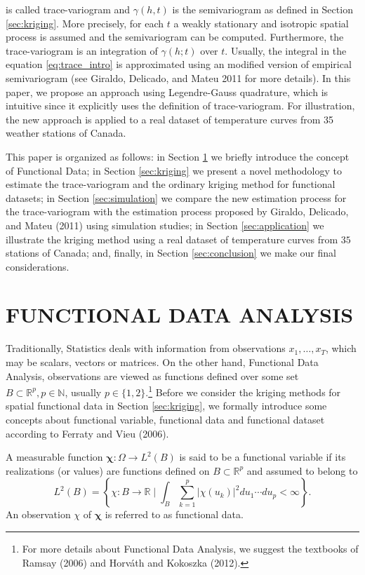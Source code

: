 \documentclass[12pt,]{article}
\theoremstyle{definition}
\theoremstyle{definition}
\theoremstyle{definition}
\theoremstyle{remark}
\let\BeginKnitrBlock\begin \let\EndKnitrBlock\end
\begin{document}
is called trace-variogram and \(\gamma(h, t)\) is the semivariogram as defined in Section \ref{sec:kriging}.
More precisely, for each \(t\) a weakly stationary and isotropic spatial process is assumed and the semivariogram can be computed. Furthermore, the trace-variogram is an
integration of \(\gamma(h;t)\) over \(t\). Usually, the integral in the equation \ref{eq:trace_intro} is approximated using an modified version of empirical semivariogram (see Giraldo, Delicado, and Mateu 2011 for more details).
In this paper, we propose an approach using Legendre-Gauss quadrature, which is intuitive since it explicitly uses the definition of trace-variogram.
For illustration, the new approach is applied to a real dataset of temperature curves from 35 weather stations of Canada.

This paper is organized as follows: in Section \ref{sec:functionalDataAnalysis} we briefly introduce the concept of Functional Data; in Section \ref{sec:kriging} we present a novel methodology to estimate the trace-variogram and the ordinary kriging method for functional datasets; in Section \ref{sec:simulation} we compare the new estimation process for the trace-variogram with the estimation process proposed by Giraldo, Delicado, and Mateu (2011) using simulation studies;
in Section \ref{sec:application} we illustrate the kriging method using a real dataset of temperature curves from \(35\) stations of Canada; and, finally, in Section \ref{sec:conclusion} we make our final considerations.

\hypertarget{sec:functionalDataAnalysis}{%
\section{FUNCTIONAL DATA ANALYSIS}\label{sec:functionalDataAnalysis}}

Traditionally, Statistics deals with information from observations \(x_1, \dots, x_T\), which may be scalars, vectors or matrices. On the other hand, Functional Data Analysis,
observations are viewed as functions defined over some set \(B \subset \mathbb{R}^p, p \in \mathbb{N}\), usually \(p \in \{1,2\}\).\footnote{For more details about Functional Data Analysis, we suggest the textbooks of Ramsay (2006) and Horváth and Kokoszka (2012).} Before we consider the kriging methods for spatial functional data in Section \ref{sec:kriging}, we formally introduce some concepts about functional variable, functional data and functional dataset
according to Ferraty and Vieu (2006).

\BeginKnitrBlock{definition}
\protect\hypertarget{def:unnamed-chunk-1}{}{\label{def:unnamed-chunk-1} }A measurable function \(\bm{\chi}: \Omega \rightarrow L^2(B)\) is said to be a functional variable if its realizations (or values) are functions defined on \(B \subset \mathbb{R}^ p\) and assumed to belong to
\[
    L^2(B) = \left\{\chi:B \longrightarrow \mathbb{R} \mid \int_B \sum_{k=1}^{p} \lvert \chi(u_k) \rvert^2 du_1\cdots du_p < \infty \right\}.
\]
An observation \(\chi\) of \(\bm{\chi}\) is referred to as functional data.
\EndKnitrBlock{definition}
\end{document}
